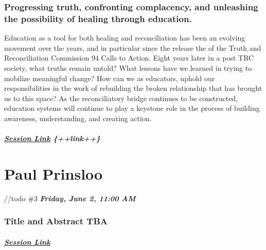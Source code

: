 \documentclass[
]{book}
\begin{document}
\begin{keynote}
\hypertarget{progressing-truth-confronting-complacency-and-unleashing-the-possibility-of-healing-through-education.}{%
\subsubsection*{Progressing truth, confronting complacency, and
unleashing the possibility of healing through
education.}\label{progressing-truth-confronting-complacency-and-unleashing-the-possibility-of-healing-through-education.}}

Education as a tool for both healing and reconciliation has been an
evolving movement over the years, and in particular since the release
the of the Truth and Reconciliation Commission 94 Calls to Action. Eight
years later in a post TRC society, what truths remain untold? What
lessons have we learned in trying to mobilize meaningful change? How can
we as educators, uphold our responsibilities in the work of rebuilding
the broken relationship that has brought us to this space? As the
reconciliatory bridge continues to be constructed, education systems
will continue to play a keystone role in the process of building
awareness, understanding, and creating action.

\hypertarget{session-link-link}{%
\subparagraph{\texorpdfstring{\href{}{Session Link}
\{++link++\}}{Session Link \{++link++\}}}\label{session-link-link}}
\end{keynote}

\hypertarget{paul-prinsloo}{%
\section*{Paul Prinsloo}\label{paul-prinsloo}}

//todo \#3
\textbf{\emph{Friday, June 2, 11:00 AM}}

\begin{keynote}
\hypertarget{title-and-abstract-tba}{%
\subsubsection{Title and Abstract TBA}\label{title-and-abstract-tba}}

\hypertarget{session-link}{%
\subparagraph{\texorpdfstring{\href{}{Session
Link}}{Session Link}}\label{session-link}}
\end{keynote}
\end{document}

